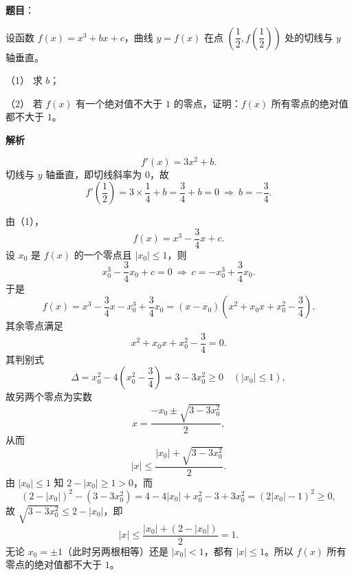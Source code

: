 \begin{answer}

\textbf{题目}：

设函数 $f(x)=x^3+bx+c$，曲线 $y=f(x)$ 在点 $\left(\dfrac12,f\left(\dfrac12\right)\right)$ 处的切线与 $y$ 轴垂直。

（1） 求 $b$；

（2） 若 $f(x)$ 有一个绝对值不大于 $1$ 的零点，证明：$f(x)$ 所有零点的绝对值都不大于 $1$。

\textbf{解析}


\nopagebreak[4]
\[f'(x)=3x^2+b .\]
切线与 $y$ 轴垂直，即切线斜率为 $0$，故
\nopagebreak[4]
\[f'\left(\frac12\right)=3\times\frac14+b=\frac34+b=0\ \Longrightarrow\ b=-\frac34 .\]


由（1），
\nopagebreak[4]
\[f(x)=x^3-\frac34x+c .\]
设 $x_0$ 是 $f(x)$ 的一个零点且 $|x_0|\leqslant1$，则
\nopagebreak[4]
\[x_0^3-\frac34x_0+c=0\ \Longrightarrow\ c=-x_0^3+\frac34x_0 .\]
于是
\nopagebreak[4]
\[f(x)=x^3-\frac34x-x_0^3+\frac34x_0=(x-x_0)\left(x^2+x_0x+x_0^2-\frac34\right).\]
其余零点满足
\nopagebreak[4]
\[x^2+x_0x+x_0^2-\frac34=0 .\]
其判别式
\nopagebreak[4]
\[\Delta=x_0^2-4\left(x_0^2-\frac34\right)=3-3x_0^2\geqslant0\quad(|x_0|\leqslant1),\]
故另两个零点为实数
\nopagebreak[4]
\[x=\frac{-x_0\pm\sqrt{3-3x_0^2}}2,\]
从而
\nopagebreak[4]
\[|x|\leqslant\frac{|x_0|+\sqrt{3-3x_0^2}}2 .\]
由 $|x_0|\leqslant1$ 知 $2-|x_0|\geqslant1>0$，而
\nopagebreak[4]
\[\left(2-|x_0|\right)^2-\left(3-3x_0^2\right)=4-4|x_0|+x_0^2-3+3x_0^2=\left(2|x_0|-1\right)^2\geqslant0,\]
故 $\sqrt{3-3x_0^2}\leqslant2-|x_0|$，即
\nopagebreak[4]
\[|x|\leqslant\frac{|x_0|+\left(2-|x_0|\right)}2=1 .\]
无论 $x_0=\pm1$（此时另两根相等）还是 $|x_0|<1$，都有 $|x|\leqslant1$。所以 $f(x)$ 所有零点的绝对值都不大于 $1$。



\end{answer}
